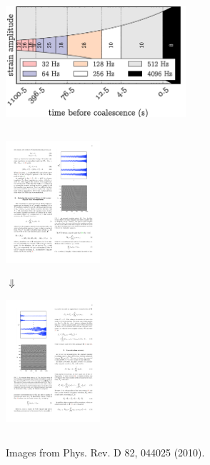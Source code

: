 \documentclass{beamer}
\begin{document}
\section[Implementation]{}

\begin{frame}
	\includegraphics[width=0.5\textwidth]{figures/envelope}
\end{frame}

\begin{frame}
	\begin{columns}
		\begin{column}{0.4\textwidth}
			\begin{center}
				\includegraphics[width=3.5cm]{figures/original-templates}
			
				$\Downarrow$
			
				\includegraphics[width=3.5cm]{figures/svd-templates}
			\end{center}
		\end{column}
		\begin{column}{0.6\textwidth}
		\end{column}
	\end{columns}
	\footnotesize{Images from Phys. Rev. D 82, 044025 (2010).}
\end{frame}
\end{document}
